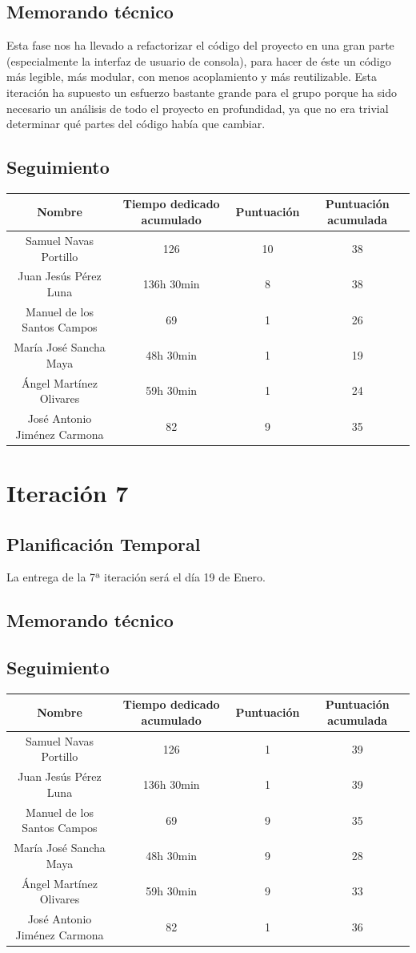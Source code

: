 \documentclass[11 pt]{book}
\begin{document}
	\section{Memorando técnico}
		Esta fase nos ha llevado a refactorizar el código del proyecto en una gran parte (especialmente la interfaz de usuario de consola), para hacer de éste un código más legible, más modular, con menos acoplamiento y más reutilizable. Esta iteración ha supuesto un esfuerzo bastante grande para el grupo porque ha sido necesario un análisis de todo el proyecto en profundidad, ya que no era trivial determinar qué partes del código había que cambiar.

	\section{Seguimiento}
		\begin{tabular}{|c|c|c|c|}
			\hline
			Nombre & Tiempo dedicado acumulado & Puntuación & Puntuación acumulada\\
			\hline
			Samuel Navas Portillo & 126 & 10 & 38\\
			Juan Jesús Pérez Luna & 136h 30min & 8 & 38\\
			Manuel de los Santos Campos & 69 & 1 & 26\\
			María José Sancha Maya & 48h 30min & 1 & 19\\
			Ángel Martínez Olivares & 59h 30min & 1 & 24\\
			José Antonio Jiménez Carmona & 82 & 9 & 35\\
			\hline
		\end{tabular}

\chapter{Iteración 7}
	\section{Planificación Temporal}
		La entrega de la 7ª iteración será el día 19 de Enero.
	
	\section{Memorando técnico}
	
	\section{Seguimiento}
		\begin{tabular}{|c|c|c|c|}
			\hline
			Nombre & Tiempo dedicado acumulado & Puntuación & Puntuación acumulada\\
			\hline
			Samuel Navas Portillo & 126 & 1 & 39\\
			Juan Jesús Pérez Luna & 136h 30min & 1 & 39\\
			Manuel de los Santos Campos & 69 & 9 & 35\\
			María José Sancha Maya & 48h 30min & 9 & 28\\
			Ángel Martínez Olivares & 59h 30min & 9 & 33\\
			José Antonio Jiménez Carmona & 82 & 1 & 36\\
			\hline
		\end{tabular}
\end{document}
